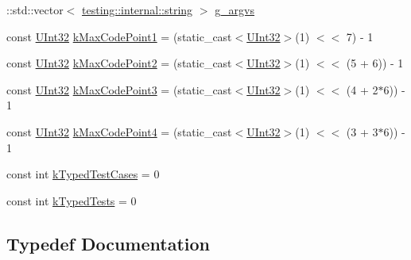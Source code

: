 \begin{DoxyCompactItemize}
\item 
\+::std\+::vector$<$ \hyperlink{namespacetesting_1_1internal_a8e8ff5b11e64078831112677156cb111}{testing\+::internal\+::string} $>$ \hyperlink{namespacetesting_1_1internal_ab7fe90df4f87f1bd8a244b0be2ccad79}{g\+\_\+argvs}
\item 
const \hyperlink{namespacetesting_1_1internal_a40d4fffcd2bf56f18b1c380615aa85e3}{U\+Int32} \hyperlink{namespacetesting_1_1internal_a128515c8ed6c0fe98e498c8042da2060}{k\+Max\+Code\+Point1} = (static\+\_\+cast$<$\hyperlink{namespacetesting_1_1internal_a40d4fffcd2bf56f18b1c380615aa85e3}{U\+Int32}$>$(1) $<$$<$ 7) -\/ 1
\item 
const \hyperlink{namespacetesting_1_1internal_a40d4fffcd2bf56f18b1c380615aa85e3}{U\+Int32} \hyperlink{namespacetesting_1_1internal_ab8f4a5ed784352f00342cfeadc72337e}{k\+Max\+Code\+Point2} = (static\+\_\+cast$<$\hyperlink{namespacetesting_1_1internal_a40d4fffcd2bf56f18b1c380615aa85e3}{U\+Int32}$>$(1) $<$$<$ (5 + 6)) -\/ 1
\item 
const \hyperlink{namespacetesting_1_1internal_a40d4fffcd2bf56f18b1c380615aa85e3}{U\+Int32} \hyperlink{namespacetesting_1_1internal_aa42bd507418e570402996e33582beed3}{k\+Max\+Code\+Point3} = (static\+\_\+cast$<$\hyperlink{namespacetesting_1_1internal_a40d4fffcd2bf56f18b1c380615aa85e3}{U\+Int32}$>$(1) $<$$<$ (4 + 2$\ast$6)) -\/ 1
\item 
const \hyperlink{namespacetesting_1_1internal_a40d4fffcd2bf56f18b1c380615aa85e3}{U\+Int32} \hyperlink{namespacetesting_1_1internal_acd87c60be9b5fedb2d017503d8834474}{k\+Max\+Code\+Point4} = (static\+\_\+cast$<$\hyperlink{namespacetesting_1_1internal_a40d4fffcd2bf56f18b1c380615aa85e3}{U\+Int32}$>$(1) $<$$<$ (3 + 3$\ast$6)) -\/ 1
\item 
const int \hyperlink{namespacetesting_1_1internal_a685ea5332074ae63b0ded2b184ac2271}{k\+Typed\+Test\+Cases} = 0
\item 
const int \hyperlink{namespacetesting_1_1internal_a53ee2d113744f9ba1d89469db4d7388b}{k\+Typed\+Tests} = 0
\end{DoxyCompactItemize}


\subsection{Typedef Documentation}
\mbox{\label{namespacetesting_1_1internal_a05c6bd9ede5ccdf25191a590d610dcc6}} 
